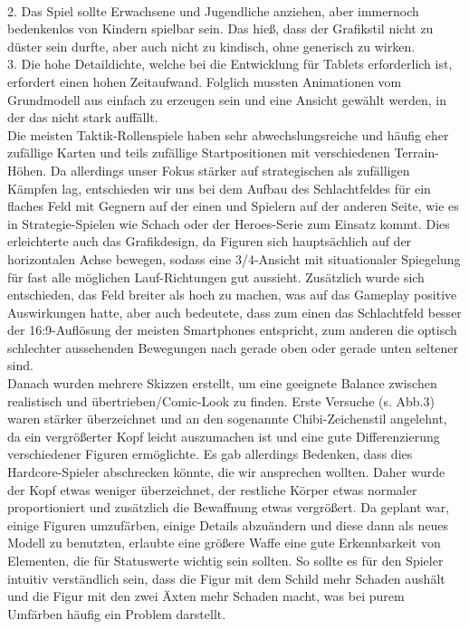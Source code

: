 \documentclass[extern,palatino]{cgBA}
\begin{document}
\\2. Das Spiel sollte Erwachsene und Jugendliche anziehen, aber immernoch bedenkenlos von Kindern spielbar sein. Das hieß, dass der Grafikstil nicht zu düster sein durfte, aber auch nicht zu kindisch, ohne generisch zu wirken.
\\3. Die hohe Detaildichte, welche bei die Entwicklung für Tablets erforderlich ist, erfordert einen hohen Zeitaufwand. Folglich mussten Animationen vom Grundmodell aus einfach zu erzeugen sein und eine Ansicht gewählt werden, in der das nicht stark auffällt.
\\Die meisten Taktik-Rollenspiele haben sehr abwechslungsreiche und häufig eher zufällige Karten und teils zufällige Startpositionen mit verschiedenen Terrain-Höhen. Da allerdings unser Fokus stärker auf strategischen als zufälligen Kämpfen lag, entschieden wir uns bei dem Aufbau des Schlachtfeldes für ein flaches Feld mit Gegnern auf der einen und Spielern auf der anderen Seite, wie es in Strategie-Spielen wie Schach oder der Heroes-Serie zum Einsatz kommt. Dies erleichterte auch das Grafikdesign, da Figuren sich hauptsächlich auf der horizontalen Achse bewegen, sodass eine 3/4-Ansicht mit situationaler Spiegelung für fast alle möglichen Lauf-Richtungen gut aussieht. Zusätzlich wurde sich entschieden, das Feld breiter als hoch zu machen, was auf das Gameplay positive Auswirkungen hatte, aber auch bedeutete, dass zum einen das Schlachtfeld besser der 16:9-Auflösung der meisten Smartphones entspricht, zum anderen die optisch schlechter aussehenden Bewegungen nach gerade oben oder gerade unten seltener sind.
\\Danach wurden mehrere Skizzen erstellt, um eine geeignete Balance zwischen realistisch und übertrieben/Comic-Look zu finden. Erste Versuche (s. Abb.3) waren stärker überzeichnet und an den sogenannte Chibi-Zeichenstil angelehnt, da ein vergrößerter Kopf leicht auszumachen ist und eine gute Differenzierung verschiedener Figuren ermöglichte. Es gab allerdings Bedenken, dass dies Hardcore-Spieler abschrecken könnte, die wir ansprechen wollten. Daher wurde der Kopf etwas weniger überzeichnet, der restliche Körper etwas normaler proportioniert und zusätzlich die Bewaffnung etwas vergrößert. Da geplant war, einige Figuren umzufärben, einige Details abzuändern und diese dann als neues Modell zu benutzten, erlaubte eine größere Waffe eine gute Erkennbarkeit von Elementen, die für Statuswerte wichtig sein sollten. So sollte es für den Spieler intuitiv verständlich sein, dass die Figur mit dem Schild mehr Schaden aushält und die Figur mit den zwei Äxten mehr Schaden macht, was bei purem Umfärben häufig ein Problem darstellt.
\end{document}
